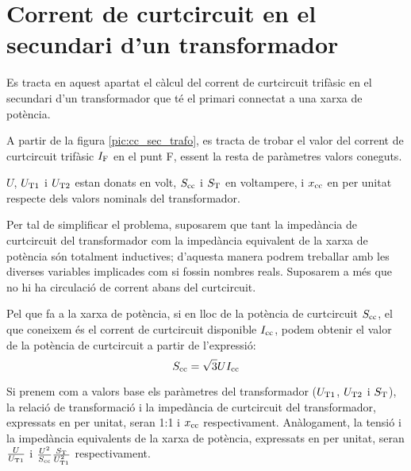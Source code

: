 \section{Corrent de curtcircuit en el  secundari d'un transformador}
\label{sec:cc-sec-trafo}

 Es tracta en aquest apartat el càlcul del corrent de curtcircuit trifàsic en el secundari d'un transformador que té el
primari connectat  a una xarxa de potència.

A partir de la figura \vref{pic:cc_sec_trafo}, es tracta de trobar
el valor del corrent de curtcircuit trifàsic $I_\mathrm{F}$ en el punt
F, essent la resta de paràmetres valors coneguts.

\begin{center}
    
     \label{pic:cc_sec_trafo}
\end{center}

$U$, $U_\mathrm{T1}$ i $U_\mathrm{T2}$ estan donats en volt,
$S_\mathrm{cc}$ i $S_\mathrm{T}$ en voltampere, i $x_\mathrm{cc}$ en per unitat
respecte dels valors nominals del transformador.


Per tal de simplificar el problema, suposarem que tant la impedància
de curtcircuit del transformador com la impedància equivalent de
la xarxa de potència són totalment inductives; d'aquesta manera
podrem treballar amb les diverses variables implicades com si
fossin nombres reals. Suposarem a més que no hi ha circulació de
corrent abans del curtcircuit.

Pel que fa a la xarxa de potència, si en lloc de la potència de curtcircuit $S_\mathrm{cc}$, el que coneixem és el corrent de curtcircuit
disponible $I_\mathrm{cc}$, podem obtenir el valor de la potència de
curtcircuit a partir de l'expressió:
\begin{equation}
    S_\mathrm{cc} = \sqrt{3} U I_\mathrm{cc}
\end{equation}

 Si prenem com a valors base els
paràmetres del transformador ($U_\mathrm{T1}$, $U_\mathrm{T2}$ i
$S_\mathrm{T}$), la relació de transformació i la impedància de curtcircuit del transformador, expressats en per unitat, seran 1:1 i
$x_\mathrm{cc}$ respectivament. Anàlogament, la tensió i la impedància
equivalents de la xarxa de potència, expressats en per unitat, seran
$\frac{U}{U_\mathrm{T1}}$ i $\frac{U^2}{S_\mathrm{cc}}
\frac{S_\mathrm{T}}{U_\mathrm{T1}^2}$ respectivament.

